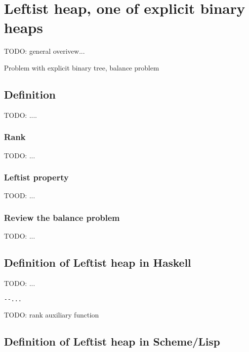 \documentclass{article}
\begin{document}
\section{Leftist heap, one of explicit binary heaps}
\label{ebheap}

TODO: general overivew...

Problem with explicit binary tree, balance problem

\subsection{Definition}

TODO: ....

\subsubsection{Rank}

TODO: ...

\subsubsection{Leftist property}

TOOD: ...

\subsubsection{Review the balance problem}

TODO: ...

\subsection*{Definition of Leftist heap in Haskell}

TODO: ...

\lstset{language=Haskell}
\begin{lstlisting}
--...
\end{lstlisting}

TODO: rank auxiliary function

\subsection*{Definition of Leftist heap in Scheme/Lisp}
\end{document}
